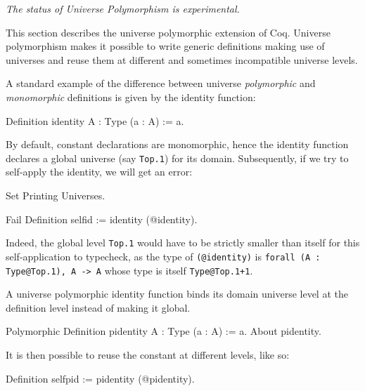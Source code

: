 
\label{Universes-full}


\begin{flushleft}
  \em The status of Universe Polymorphism is experimental.
\end{flushleft}

This section describes the universe polymorphic extension of Coq.
Universe polymorphism makes it possible to write generic definitions making use of
universes and reuse them at different and sometimes incompatible universe levels.

A standard example of the difference between universe \emph{polymorphic} and
\emph{monomorphic} definitions is given by the identity function:

\begin{coq_example*}
Definition identity {A : Type} (a : A) := a.
\end{coq_example*}

By default, constant declarations are monomorphic, hence the identity
function declares a global universe (say \texttt{Top.1}) for its
domain. Subsequently, if we try to self-apply the identity, we will get
an error:

\begin{coq_eval}
Set Printing Universes.
\end{coq_eval}
\begin{coq_example}
Fail Definition selfid := identity (@identity).
\end{coq_example}

Indeed, the global level \texttt{Top.1} would have to be strictly smaller than itself
for this self-application to typecheck, as the type of \texttt{(@identity)} is
\texttt{forall (A : Type@{Top.1}), A -> A} whose type is itself \texttt{Type@{Top.1+1}}.

A universe polymorphic identity function binds its domain universe level
at the definition level instead of making it global.

\begin{coq_example}
Polymorphic Definition pidentity {A : Type} (a : A) := a.
About pidentity.
\end{coq_example}

It is then possible to reuse the constant at different levels, like so:

\begin{coq_example}
Definition selfpid := pidentity (@pidentity).
\end{coq_example}

